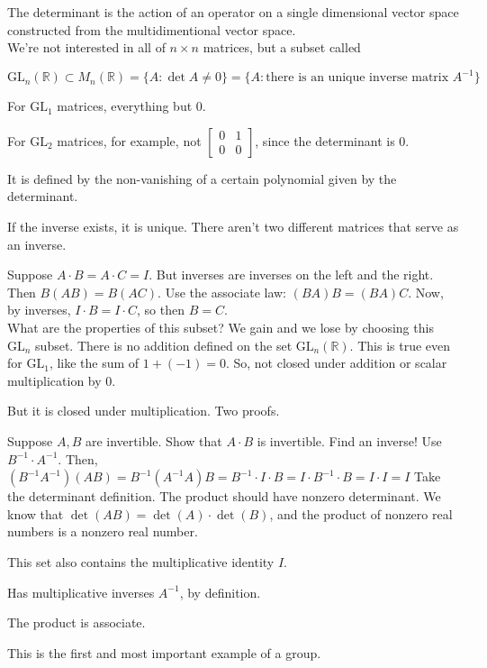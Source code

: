 \documentclass[12pt]{article}
\newcommand{\RR}{\mathbb{R}}
\newcommand{\GL}{\text{GL}}
\newcommand{\inv}[1]{#1^{-1}}
\theoremstyle{definition}
\begin{document}
The determinant is the action of an operator on a single dimensional vector space constructed
from the multidimentional vector space.
\\

We're not interested in all of \(n \times n\) matrices, but a subset called

\(\GL_n(\RR)\subset M_n(\RR) = \{A: \det A\neq 0\} = \{A: \text{there is an unique inverse matrix }\inv{A}\} \)

For \(\GL_1\) matrices, everything but 0.

For \(\GL_2\) matrices, for example, not \(\left[\begin{smallmatrix}
    0 & 1\\
    0 & 0
\end{smallmatrix}\right]\), since the determinant is 0.

It is defined by the non-vanishing of a certain polynomial given by the determinant.

If the inverse exists, it is unique. There aren't two different matrices that serve as an inverse.

Suppose \(A\cdot B = A\cdot C = I\). But inverses are inverses on the left and the right.
Then \(B(AB) = B(AC)\). Use the associate law: \((BA)B = (BA)C\). Now, by inverses,
\(I\cdot B = I\cdot C\), so then \(B = C\).
\\

What are the properties of this subset? We gain and we lose by choosing this \(\GL_n\) subset. 
There is no addition defined on the set \(\GL_n(\RR)\).
This is true even for \(\GL_1\), like the sum of \(1 + (-1) = 0\).
So, not closed under addition or scalar multiplication by 0.

But it is closed under multiplication. Two proofs.

Suppose \(A, B\) are invertible. Show that \(A\cdot B\) is invertible. Find an inverse!
Use \(\inv{B}\cdot\inv{A}\). Then, \((\inv{B}\inv{A})(AB)=\inv{B}(\inv{A}A)B=\inv{B}\cdot I\cdot B=I\cdot\inv{B}\cdot B=I\cdot I=I\)
Take the determinant definition. The product should have nonzero determinant. We know that
\(\det(AB) = \det(A)\cdot\det(B)\), and the product of nonzero real numbers is a nonzero real number.

This set also contains the multiplicative identity \(I\).

Has multiplicative inverses \(\inv{A}\), by definition.

The product is associate.

This is the first and most important example of a group.
\\
\end{document}
